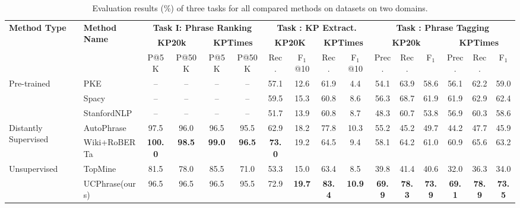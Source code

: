 \documentclass[sigconf]{acmart}
\newcommand{\our}{\mbox{UCPhrase}\xspace}
\newcommand{\Rom}[1]{\uppercase\expandafter{\romannumeral #1}}
\newcommand{\smtx}[1]{\scriptsize{#1}}
\begin{document}
\begin{table*}[]
    \centering
    \renewcommand\tabcolsep{2pt}
    \renewcommand\arraystretch{.85}
    \caption{Evaluation results (\%) of three tasks for all compared methods on datasets on two domains.}
    \label{tab:main}
    \small
    \begin{tabular}{ll cccc cccc  cccccc}
        \toprule
        \multirow{3}{*}{\textbf{Method Type}} & \multirow{3}{*}{\textbf{Method Name}} & \multicolumn{4}{c}{\textbf{Task I: Phrase Ranking}} & \multicolumn{4}{c}{\textbf{Task \Rom{2}: KP Extract.}} &  \multicolumn{6}{c}{\textbf{Task \Rom{3}: Phrase Tagging}}  \\
        \cmidrule(lr){3-6} \cmidrule(lr){7-10} \cmidrule(lr){11-16}
        & & \multicolumn{2}{c}{\textbf{KP20k}} & \multicolumn{2}{c}{\textbf{KPTimes}} & \multicolumn{2}{c}{\textbf{KP20K}} & \multicolumn{2}{c}{\textbf{KPTimes}} & \multicolumn{3}{c}{\textbf{KP20k}} & \multicolumn{3}{c}{\textbf{KPTimes}}\\
        \cmidrule(lr){3-4} \cmidrule(lr){5-6} \cmidrule(lr){7-8} \cmidrule(lr){9-10} \cmidrule(lr){11-13} \cmidrule(lr){14-16}
        & & P\smtx{@5K} & P\smtx{@50K} & P\smtx{@5K} & P\smtx{@50K} & Rec. & F$_1$\smtx{@10} & Rec. & F$_1$\smtx{@10} & Prec. & Rec. & F$_1$  & Prec. & Rec. & F$_1$ \\
        \midrule
\multirow{3}{*}{Pre-trained} & PKE \cite{boudin2016pke}  & -- & -- & -- & -- & 57.1 & 12.6 & 61.9 & 4.4 & 54.1 & 63.9 & 58.6 & 56.1 & 62.2 & 59.0 \\
        & Spacy \cite{spacy} & -- & -- & -- & --  & 59.5 & 15.3 & 60.8 & 8.6 &  56.3 & 68.7 & 61.9 & 61.9 & 62.9 & 62.4\\
        & StanfordNLP \cite{manning2014stanford} & -- & -- & -- & -- & 51.7 & 13.9 & 60.8 & 8.7 & 48.3 & 60.7 & 53.8 & 56.9 & 60.3 & 58.6\\
         \midrule
\multirow{2}{*}{Distantly Supervised} & AutoPhrase \cite{shang2018automated} & 97.5 & 96.0 & 96.5 & 95.5 &  62.9 & 18.2 & 77.8 & 10.3 & 55.2 & 45.2 & 49.7 & 44.2 & 47.7 & 45.9\\
        & Wiki+RoBERTa & \textbf{100.0} & \textbf{98.5} & \textbf{99.0} & \textbf{96.5} & \textbf{73.0} & 19.2 & 64.5 & 9.4 & 58.1 & 64.2 & 61.0 & 60.9 & 65.6 & 63.2 \\
        \midrule
\multirow{2}{*}{Unsupervised} & TopMine \cite{el2014scalable} & 81.5 & 78.0 & 85.5 & 71.0 & 53.3 & 15.0 & 63.4 & 8.5 & 39.8 & 41.4 & 40.6 & 32.0 & 36.3 & 34.0 \\
        & \our (ours) & 96.5 & 96.5 & 96.5 & 95.5 & 72.9 & \textbf{19.7} & \textbf{83.4} & \textbf{10.9} & \textbf{69.9} & \textbf{78.3} & \textbf{73.9} & \textbf{69.1} & \textbf{78.9} & \textbf{73.5} \\
        \bottomrule
    \end{tabular}
    \vspace{-3mm}
\end{table*}
\end{document}
